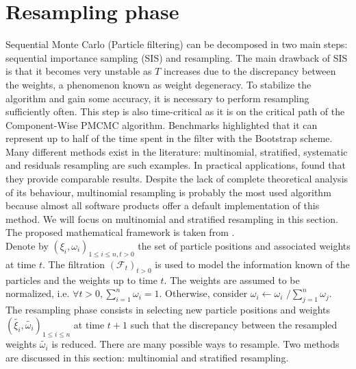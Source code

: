 \documentclass[11pt,a4,twosided,singlespacing,titlepagenumber=on]{scrreprt}
\numberwithin{equation}{chapter} %
\theoremstyle{remark}
\begin{document}
\section{Resampling phase}
Sequential Monte Carlo (Particle filtering) can be decomposed in two main steps: sequential importance sampling (SIS) and resampling. The main drawback of SIS is that it becomes very unstable as $T$ increases due to the discrepancy between the weights, a phenomenon known as weight degeneracy. To stabilize the algorithm and gain some accuracy, it is necessary to perform resampling sufficiently often. This step is also time-critical as it is on the critical path of the Component-Wise PMCMC algorithm. Benchmarks highlighted that it can represent up to half of the time spent in the filter with the Bootstrap scheme. Many different methods exist in the literature: multinomial, stratified, systematic and residuals resampling are such examples. In practical applications, \cite{douc2005} found that they provide comparable results. Despite the lack of complete theoretical analysis of its behaviour, multinomial resampling is probably the most used algorithm because almost all software products offer a default implementation of this method. We will focus on multinomial and stratified resampling in this section. The proposed mathematical framework is taken from \cite{douc2005}. \\

Denote by $\left( \xi_i, \omega_i \right)_{1 \leq i \leq n, t > 0}$ the set of particle positions and associated weights at time $t$. The filtration $(\mathcal{F}_t)_{t > 0}$ is used to model the information known of the particles and the weights up to time $t$. The weights are assumed to be normalized, i.e. $\forall t > 0, \sum_{i=1}^n \omega_i = 1$. Otherwise, consider $\omega_i \leftarrow \omega_i \text{ /} \sum_{j=1}^n \omega_j$. The resampling phase consists in selecting new particle positions and weights $\left( \widetilde{\xi_i}, \widetilde{\omega_i} \right)_{1 \leq i \leq n}$ at time $t+1$ such that the discrepancy between the resampled weights $\widetilde{\omega_i}$ is reduced. There are many possible ways to resample. Two methods are discussed in this section: multinomial and stratified resampling. \\
\end{document}
